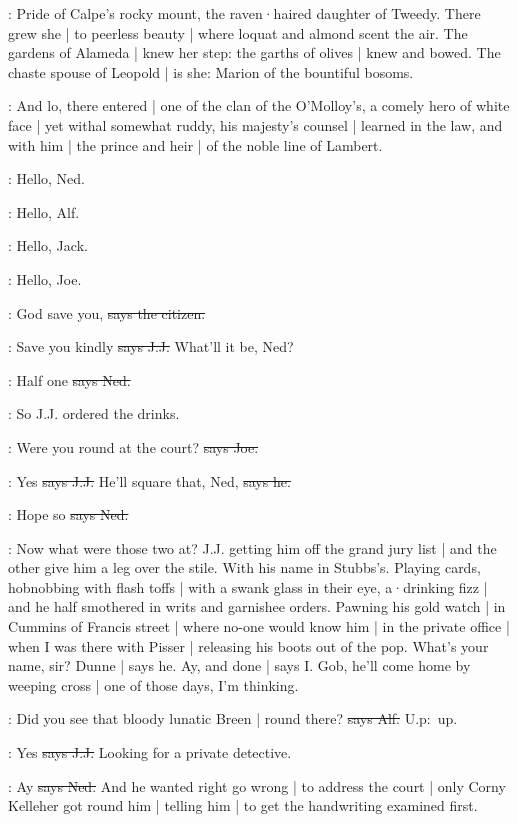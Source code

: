:
Pride of Calpe's rocky mount,
the raven·haired daughter of Tweedy.
There grew she |
to peerless beauty |
where loquat and almond scent the air.
The gardens of Alameda |
knew her step:
the garths of olives |
knew and bowed.
The chaste spouse of Leopold |
is she:
Marion of the bountiful bosoms.

:
And lo,
there entered |
one of the clan of the O'Molloy's,
a comely hero of white face |
yet withal somewhat ruddy,
his majesty's counsel |
learned in the law,
and with him |
the prince and heir |
of the noble line of Lambert.

\bergan:
Hello,
Ned.

\lambert:
Hello,
Alf.

\joe:
Hello,
Jack.

\jjom:
Hello,
Joe.

\citizen:
God save you,
\sout{says the citizen.}

\jjom:
Save you kindly
\sout{says J.J.}
What'll it be,
Ned?

\lambert:
Half one
\sout{says Ned.}

\Nq:
So J.J. ordered the drinks.

\joe:
Were you round at the court?
\sout{says Joe.}

\jjom:
Yes
\sout{says J.J.}
He'll square that,
Ned,
\sout{says he.}

\lambert:
Hope so
\sout{says Ned.}

\Nq:
Now what were those two at?
J.J. getting him off the grand jury list |
and the other give him a leg over the stile.
With his name in Stubbs's.
Playing cards,
hobnobbing with flash toffs |
with a swank glass in their eye,
a·drinking fizz |
and he half smothered in writs and garnishee orders.
Pawning his gold watch |
in Cummins of Francis street |
where no-one would know him |
in the private office |
when I was there with Pisser |
releasing his boots out of the pop.
What's your name,
sir?
Dunne |
says he.
Ay,
and done |
says I.
Gob,
he'll come home by weeping cross |
one of those days,
I'm thinking.%

\bergan:
Did you see that bloody lunatic Breen |
round there?
\sout{says Alf.}
U.p:~up.

\jjom:
Yes
\sout{says J.J.}
Looking for a private detective.

\lambert:
Ay
\sout{says Ned.}
And he wanted right go wrong |
to address the court |
only Corny Kelleher got round him |
telling him |
to get the handwriting examined first.

